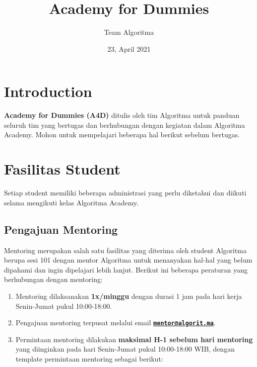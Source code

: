 \documentclass[
]{book}
\title{Academy for Dummies}
\author{Team Algoritma}
\date{23, April 2021}
\providecommand{\tightlist}{%
  \setlength{\itemsep}{0pt}\setlength{\parskip}{0pt}}
\begin{document}
\maketitle

{
\setcounter{tocdepth}{1}
\tableofcontents
}
\hypertarget{introduction}{%
\chapter{Introduction}\label{introduction}}

\textbf{Academy for Dummies (A4D)} ditulis oleh tim Algoritma untuk panduan seluruh tim yang bertugas dan berhubungan dengan kegiatan dalam Algoritma Academy. Mohon untuk mempelajari beberapa hal berikut sebelum bertugas.

\hypertarget{fasilitas-student}{%
\chapter{Fasilitas Student}\label{fasilitas-student}}

Setiap student memiliki beberapa administrasi yang perlu diketahui dan diikuti selama mengikuti kelas Algoritma Academy.

\hypertarget{pengajuan-mentoring}{%
\section{Pengajuan Mentoring}\label{pengajuan-mentoring}}

Mentoring merupakan salah satu fasilitas yang diterima oleh student Algoritma berupa sesi 101 dengan mentor Algoritma untuk menanyakan hal-hal yang belum dipahami dan ingin dipelajari lebih lanjut. Berikut ini beberapa peraturan yang berhubungan dengan mentoring:

\begin{enumerate}
\def\labelenumi{\arabic{enumi}.}
\tightlist
\item
  Mentoring dilaksanakan \textbf{1x/minggu} dengan durasi 1 jam pada hari kerja Senin-Jumat pukul 10:00-18:00.
\item
  Pengajuan mentoring terpusat melalui email \textbf{\href{mailto:mentor@algorit.ma}{\nolinkurl{mentor@algorit.ma}}}.
\item
  Permintaan mentoring dilakukan \textbf{maksimal H-1 sebelum hari mentoring} yang diinginkan pada hari Senin-Jumat pukul 10:00-18:00 WIB, dengan template permintaan mentoring sebagai berikut:
\end{enumerate}
\end{document}
